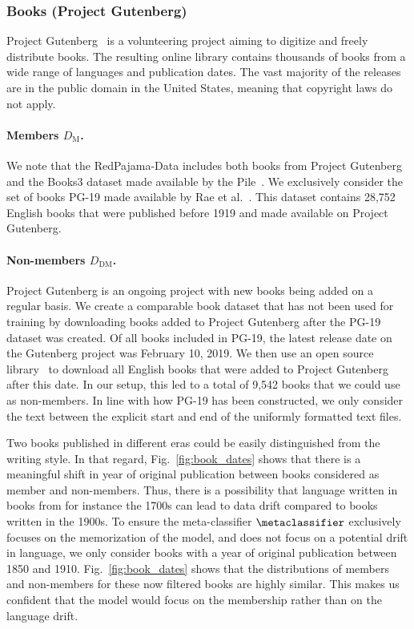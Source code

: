 \documentclass[twocolumn,10pt]{article}
\begin{document}
\subsubsection{Books (Project Gutenberg)}
    
Project Gutenberg~\cite{projectgutenberg} is a volunteering project aiming to digitize and freely distribute books. The resulting online library contains thousands of books from a wide range of languages and publication dates. The vast majority of the releases are in the public domain in the United States, meaning that copyright laws do not apply. 

\paragraph{\textbf{Members $D_{\text{M}}$}.} We note that the RedPajama-Data includes both books from Project Gutenberg and the Books3 dataset made available by the Pile~\cite{gao2020pile}. We exclusively consider the set of books PG-19 made available by Rae et al.~\cite{rae2019compressive}. This dataset contains 28,752 English books that were published before 1919 and made available on Project Gutenberg.

\paragraph{\textbf{Non-members $D_{\text{DM}}$}.} Project Gutenberg is an ongoing project with new books being added on a regular basis. We create a comparable book dataset that has not been used for training by downloading books added to Project Gutenberg after the PG-19 dataset was created. Of all books included in PG-19, the latest release date on the Gutenberg project was February 10, 2019. We then use an open source library~\cite{kpullygutenberg} to download all English books that were added to Project Gutenberg after this date. In our setup, this led to a total of 9,542 books that we could use as non-members. In line with how PG-19 has been constructed, we only consider the text between the explicit start and end of the uniformly formatted text files. 

Two books published in different eras could be easily distinguished from the writing style. In that regard, Fig.~\ref{fig:book_dates} shows that there is a meaningful shift in year of original publication between books considered as member and non-members. Thus, there is a possibility that language written in books from for instance the 1700s can lead to data drift compared to books written in the 1900s. To ensure the meta-classifier $\metaclassifier$ exclusively focuses on the memorization of the model, and does not focus on a potential drift in language, we only consider books with a year of original publication between 1850 and 1910. Fig.~\ref{fig:book_dates} shows that the distributions of members and non-members for these now filtered books are highly similar. This makes us confident that the model would focus on the membership rather than on the language drift.
\end{document}
